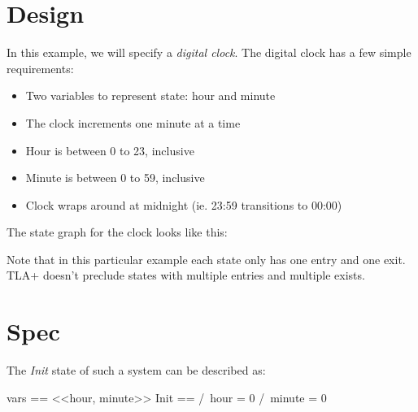 \section{Design}

In this example, we will specify a \textit{digital clock}. The digital clock has
a few simple requirements:
\begin{itemize}
\item Two variables to represent state: hour and minute
\item The clock increments one minute at a time
\item Hour is between 0 to 23, inclusive
\item Minute is between 0 to 59, inclusive
\item Clock wraps around at midnight (ie. 23:59 transitions to 00:00)
\end{itemize}

The state graph for the clock looks like this: 
\begin{center}
\end{center}

Note that in this particular example each state only has one entry and one exit.
TLA+ doesn't preclude states with multiple entries and multiple exists. 

\section{Spec}

The \textit{Init} state of such a system can be described as: \newline
\begin{tla}
    vars == <<hour, minute>>
    Init ==
        /\ hour = 0
        /\ minute = 0
\end{tla}
\begin{tlatex}
%
%
%
\end{tlatex}
 \newline

